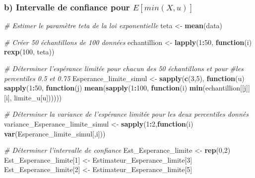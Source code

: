 \documentclass[]{article}
\newenvironment{Shaded}{\begin{snugshade}}{\end{snugshade}}
\newcommand{\KeywordTok}[1]{\textcolor[rgb]{0.13,0.29,0.53}{\textbf{#1}}}
\newcommand{\DecValTok}[1]{\textcolor[rgb]{0.00,0.00,0.81}{#1}}
\newcommand{\StringTok}[1]{\textcolor[rgb]{0.31,0.60,0.02}{#1}}
\newcommand{\CommentTok}[1]{\textcolor[rgb]{0.56,0.35,0.01}{\textit{#1}}}
\newcommand{\ControlFlowTok}[1]{\textcolor[rgb]{0.13,0.29,0.53}{\textbf{#1}}}
\newcommand{\OperatorTok}[1]{\textcolor[rgb]{0.81,0.36,0.00}{\textbf{#1}}}
\newcommand{\NormalTok}[1]{#1}
\begin{document}
\subsubsection{\texorpdfstring{b) Intervalle de confiance pour
\(E[min(X,u)]\)}{b) Intervalle de confiance pour E{[}min(X,u){]}}}\label{b-intervalle-de-confiance-pour-eminxu}

\begin{Shaded}
\begin{Highlighting}[]
\CommentTok{# Estimer le paramètre teta de la loi exponentielle}
\NormalTok{teta <-}\StringTok{ }\KeywordTok{mean}\NormalTok{(data)}

\CommentTok{# Créer 50 échantillons de 100 données}
\NormalTok{echantillion <-}\StringTok{ }\KeywordTok{lapply}\NormalTok{(}\DecValTok{1}\OperatorTok{:}\DecValTok{50}\NormalTok{, }\ControlFlowTok{function}\NormalTok{(i) }\KeywordTok{rexp}\NormalTok{(}\DecValTok{100}\NormalTok{, teta))}

\CommentTok{# Déterminer l'espérance limitée pour chacun des 50 échantillons et pour }
\CommentTok{#les percentiles 0.5 et 0.75}
\NormalTok{Esperance_limite_simul <-}\StringTok{ }\KeywordTok{sapply}\NormalTok{(}\KeywordTok{c}\NormalTok{(}\DecValTok{3}\NormalTok{,}\DecValTok{5}\NormalTok{), }\ControlFlowTok{function}\NormalTok{(u) }
                                \KeywordTok{sapply}\NormalTok{(}\DecValTok{1}\OperatorTok{:}\DecValTok{50}\NormalTok{, }\ControlFlowTok{function}\NormalTok{(j) }
                                    \KeywordTok{mean}\NormalTok{(}\KeywordTok{sapply}\NormalTok{(}\DecValTok{1}\OperatorTok{:}\DecValTok{100}\NormalTok{, }\ControlFlowTok{function}\NormalTok{(i) }
                                        \KeywordTok{min}\NormalTok{(echantillion[[j]][i], limite_u[u])))))}

\CommentTok{# Déterminer la variance de l'espérance limitée pour les deux percentiles donnés}
\NormalTok{variance_Esperance_limite_simul <-}\StringTok{ }\KeywordTok{sapply}\NormalTok{(}\DecValTok{1}\OperatorTok{:}\DecValTok{2}\NormalTok{,}\ControlFlowTok{function}\NormalTok{(i) }\KeywordTok{var}\NormalTok{(Esperance_limite_simul[,i]))}

\CommentTok{# Déterminer l'intervalle de confiance}
\NormalTok{Est_Esperance_limite <-}\StringTok{ }\KeywordTok{rep}\NormalTok{(}\DecValTok{0}\NormalTok{,}\DecValTok{2}\NormalTok{)}
\NormalTok{Est_Esperance_limite[}\DecValTok{1}\NormalTok{] <-}\StringTok{ }\NormalTok{Estimateur_Esperance_limite[}\DecValTok{3}\NormalTok{]}
\NormalTok{Est_Esperance_limite[}\DecValTok{2}\NormalTok{] <-}\StringTok{ }\NormalTok{Estimateur_Esperance_limite[}\DecValTok{5}\NormalTok{]}


\end{Highlighting}
\end{Shaded}
\end{document}
